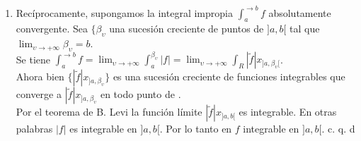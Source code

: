 \begin{enumerate}
Además $\lim_{\upsilon \to + \infty} \tilde{f}|x_{]a,\beta_\upsilon[}=|\tilde{f}|x_{]a,\beta_\upsilon[}$ en todo punto de \R \phantom{} y $|\tilde{f}| x_{]a,\beta_\upsilon[} \leq | \tilde{f}|=$ función integrable independiente de $\upsilon$.\\
Por el teorema de Lebesgue se puede pasar al límite para $\upsilon \to +\infty$ bajo el signo integral en el segundo miembro de (1.10). Se consigue:\\
\begin{equation*}
\lim_{\upsilon \to +\infty}\int_{a}^{\beta_\upsilon}|f|=\int_\R |\tilde{f}| x_{]a,b[}.
\end{equation*}
Así pues existe la integral impropia $\int_a^{\to b}|f|$ y es igual a $\int_a^b |f|$. Esto quiere decir que la integral impropia $\int_a^{\to b}f$ es absolutamente convergente.\\
Con la misma significación de $\lbrace \beta_\upsilon \rbrace$ escribamos ahora:\\
\begin{equation}
\int_a^{\beta_\upsilon}f=\int_\R \tilde{f}x_{]a,\beta_\upsilon[}
\end{equation}
Se tiene $\lim_{\upsilon \to +\infty}\tilde{f}x_{]a,\beta_\upsilon[}=\tilde{f}x_{]a,b[}$ en todo punto de \R. \phantom{} y $|\tilde{f}x_{]a,\beta_\upsilon[}| \leq |\tilde{f}|=$función integrable independiente de $\upsilon$. \\
Por el teorema de Lebesgue se puede pasar al límite para $\upsilon \to +\infty$ en el segundo miembro de (1.11). Se consigue:
$$
\lim_{\upsilon \to +\infty}\int_a^{\beta_\upsilon}f=\int_\R \tilde{f}x_{]a,b[}
$$
$$
\int_a^{\to b}f=\int_a^b f.
$$
\item Recíprocamente, supongamos la integral impropia $\int_a^{\to b}f$ absolutamente convergente. Sea $\lbrace \beta_\upsilon$ una sucesión creciente de puntos de $]a,b[$ tal que $\lim_{\upsilon \to +\infty}\beta_\upsilon=b$.\\
Se tiene $\int_a^{\to b}f=\lim_{\upsilon \to +\infty} \int_a^{\beta_\upsilon}|f|=\lim_{\upsilon \to +\infty}\int_R |\tilde{f}|x_{]a,\beta_\upsilon[}$.\\
Ahora bien $\lbrace  |\tilde{f}|x_{]a,\beta_\upsilon} \rbrace$ es una sucesión creciente de funciones integrables que converge a  $|\tilde{f}|x_{]a,\beta_\upsilon}$ en todo punto de \R .\\
Por el teorema de B. Levi la función límite $ |\tilde{f}|x_{]a,b[}$ es integrable. En otras palabras $|f|$ es integrable en $]a,b[$. Por lo tanto en $f$ integrable en $]a,b[$.
\hspace{9cm} c. q. d
\end{enumerate} 
